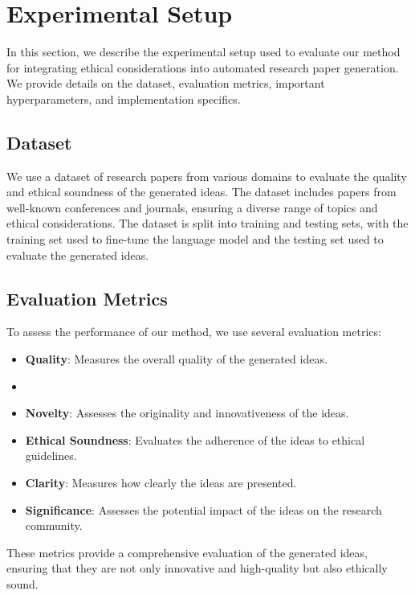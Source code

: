 \documentclass{article} %
\begin{document}
\section{Experimental Setup}
\label{sec:experimental}

In this section, we describe the experimental setup used to evaluate our method for integrating ethical considerations into automated research paper generation. We provide details on the dataset, evaluation metrics, important hyperparameters, and implementation specifics.

\subsection{Dataset}
We use a dataset of research papers from various domains to evaluate the quality and ethical soundness of the generated ideas. The dataset includes papers from well-known conferences and journals, ensuring a diverse range of topics and ethical considerations. The dataset is split into training and testing sets, with the training set used to fine-tune the language model and the testing set used to evaluate the generated ideas.

\subsection{Evaluation Metrics}
To assess the performance of our method, we use several evaluation metrics:
\begin{itemize}
    \item \textbf{Quality}: Measures the overall quality of the generated ideas.
    \item \item \textbf{Novelty}: Assesses the originality and innovativeness of the ideas.
    \item \textbf{Ethical Soundness}: Evaluates the adherence of the ideas to ethical guidelines.
    \item \textbf{Clarity}: Measures how clearly the ideas are presented.
    \item \textbf{Significance}: Assesses the potential impact of the ideas on the research community.
\end{itemize}
These metrics provide a comprehensive evaluation of the generated ideas, ensuring that they are not only innovative and high-quality but also ethically sound.
\end{document}

